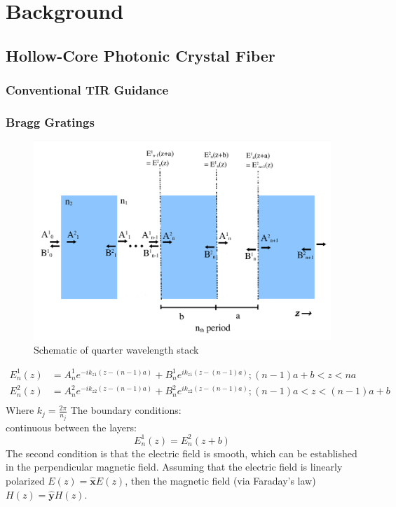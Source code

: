\chapter{Background}

\section{Hollow-Core Photonic Crystal Fiber}
\subsection{Conventional TIR Guidance}

\subsection{Bragg Gratings}
\begin{figure}[h!]
	\centering
	\includegraphics[width=\textwidth]{./Figures/HCPCF/DBR.png}
	\caption{Schematic of quarter wavelength stack}
\end{figure}
\clearpage
\begin{equation}
	\begin{aligned}
		E^1_n(z) &= A^1_n e^{-ik_{z1}(z-(n-1)a)} + B^1_n e^{ik_{z1}(z-(n-1)a)};  (n-1)a+b<z<na\\
		E^2_n(z) &= A^2_n e^{-ik_{z2}(z-(n-1)a)} + B^2_n e^{ik_{z2}(z-(n-1)a)};  (n-1)a<z<(n-1)a+b\\
	\end{aligned}
\end{equation}
Where $k _j= \frac{2\pi}{n_j}$
The boundary conditions:\\
continuous between the layers:
\begin{equation}
		E^1_n(z) = E^2_n(z+b)
\end{equation}
The second condition is that the electric field is smooth, which can be established in the perpendicular magnetic field. Assuming that the electric field is linearly polarized $E(z) = \boldsymbol{\hat{x}}E(z)$, then the magnetic field (via Faraday's law) $H(z) = \boldsymbol{\hat{y}}H(z)$.

